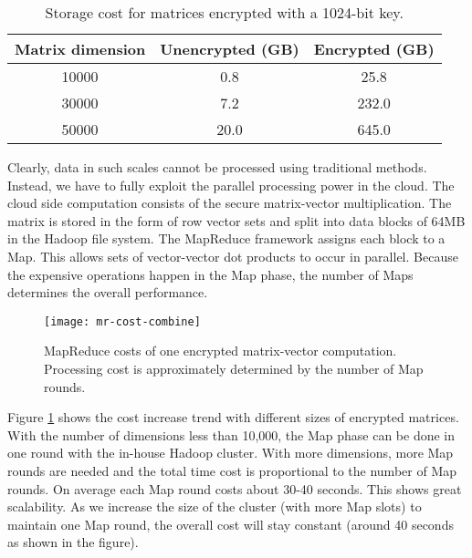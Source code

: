 \documentclass[10pt, conference, compsocconf]{IEEEtran}
\begin{document}
\begin{table}[tbh]
\scriptsize
\centering
\begin{tabular}{|c|c|c|}
\hline
Matrix dimension &Unencrypted (GB) & Encrypted (GB) \\
\hline
10000& 0.8 & 25.8\\
30000&7.2 & 232.0\\
50000&20.0& 645.0\\
\hline
\end{tabular}
\caption{Storage cost for matrices encrypted with a 1024-bit key.} \label{tab:cloud-storage-cost}
\vspace{-0.5cm}
\normalsize
\end{table}
 
Clearly, data in such scales cannot be processed using traditional methods. Instead, we have to fully exploit the parallel processing power in the cloud. The cloud side computation consists of the secure matrix-vector multiplication. The matrix is stored in the form of row vector sets and split into data blocks of 64MB in the Hadoop file system. The MapReduce framework assigns each block to a Map. This allows sets of vector-vector dot products to occur in parallel. Because the expensive operations happen in the Map phase, the number of Maps determines the overall performance. 

\begin{figure}[tbh]
\centering
\begin{minipage}{.9\linewidth}
\centering
\texttt{[image: mr-cost-combine]}
\vspace{-0.75cm}
\caption{MapReduce costs of one encrypted matrix-vector computation.  Processing cost is approximately determined by the number of Map rounds.}\label{fig:mr-cost-combine}
\end{minipage}
\vspace{-0.5cm}
\end{figure}

Figure \ref{fig:mr-cost-combine} shows the cost increase trend with different sizes of encrypted matrices. With the number of dimensions less than 10,000, the Map phase can be done in one round with the in-house Hadoop cluster. With more dimensions, more Map rounds are needed and the total time cost is proportional to the number of Map rounds. On average each Map round costs about 30-40 seconds. This shows great scalability. As we increase the size of the cluster (with more Map slots) to maintain one Map round, the overall cost will stay constant (around 40 seconds as shown in the figure). 
\end{document}
